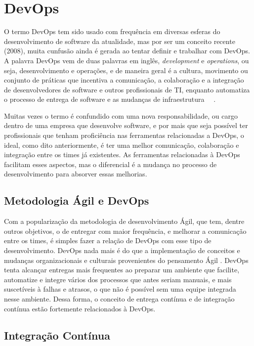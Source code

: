 \section{DevOps}
\label{sec:devops}

O termo DevOps tem sido usado com frequência em diversas esferas do
desenvolvimento de software da atualidade, mas por ser um conceito recente
(2008), muita cunfusão ainda é gerada ao tentar definir e trabalhar com DevOps.
A palavra DevOps vem de duas palavras em inglês, \textit{development} e \textit{operations},
ou seja, desenvolvimento e operações, e de maneira geral é a cultura, movimento
ou conjunto de práticas que incentiva a comunicação, a colaboração e a integração de
desenvolvedores de software e outros profissionais de TI, enquanto automatiza o
processo de entrega de software e as mudanças de infraestrutura 
~\cite{loukides2012devops}~\cite{erich2014mapping}.

Muitas vezes o termo é confundido com uma nova responsabilidade, ou cargo
dentro de uma empresa que desenvolve software, e por mais que seja possível
ter profissionais que tenham proficiência nas ferramentas relacionadas a
DevOps, o ideal, como dito anteriormente, é ter uma melhor comunicação,
colaboração e integração entre os times já existentes. As ferramentas
relacionadas à DevOps facilitam esses aspectos, mas o diferencial é a
mudança no processo de desenvolvimento para absorver essas melhorias.

\subsection{Metodologia Ágil e DevOps}

Com a popularização da metodologia de desenvolvimento Ágil, que tem, dentre outros
objetivos, o de entregar com maior frequência, e melhorar a comunicação entre os
times, é simples fazer a relação de DevOps com esse tipo de desenvolvimento.
DevOps nada mais é do que a implementação de conceitos e mudanças organizacionais
e culturais provenientes do pensamento Ágil \cite{scott2014}. DevOps tenta
alcançar entregas mais frequentes ao preparar um ambiente que facilite,
automatize e integre vários dos processos que antes seriam manuais, e mais
suscetíveis à falhas e atrasos, o que não é possível sem uma equipe integrada
nesse ambiente. Dessa forma, o conceito de entrega contínua e de integração
contínua estão fortemente relacionados à DevOps.

\subsection{Integração Contínua}

